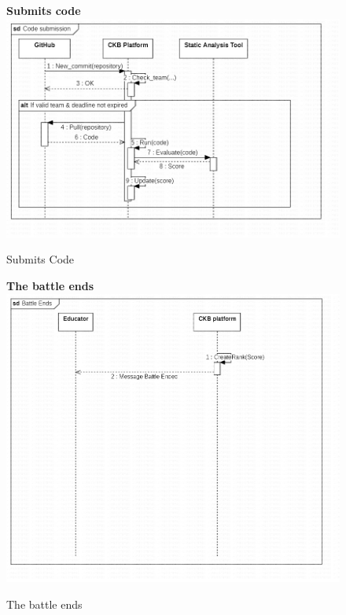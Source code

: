\begin{enumerate}[label=\textbf{[UC\arabic*]}]
    \begin{figure}
    \item \textbf{Submits code}
        \centering
        \includegraphics[width= \textwidth]{Images/Code submission.jpg}
        \caption{Submits Code}
        \label{fig:enter-label}
    \end{figure}

    \begin{figure}
    \item \textbf{The battle ends}
        \centering
        \includegraphics[width= \textwidth]{Images/Battle Ends.jpg}
        \caption{The battle ends}
        \label{fig:enter-label}
    \end{figure}
    

\end{enumerate}
